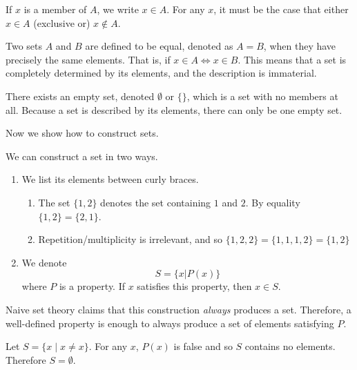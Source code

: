 \documentclass{article}
\begin{document}
    \begin{definition}[Membership]
      If $x$ is a member of $A$, we write $x \in A$. For any $x$, it must be the case that either $x \in A$ (exclusive or) $x \not\in A$. 
    \end{definition}
    
    \begin{definition}[Equality]
      Two sets $A$ and $B$ are defined to be equal, denoted as $A = B$, when they have precisely the same elements. That is, if $x \in A \iff x \in B$. This means that a set is completely determined by its elements, and the description is immaterial. 
    \end{definition}

    \begin{definition}
      There exists an empty set, denoted $\emptyset$ or $\{\}$, which is a set with no members at all. Because a set is described by its elements, there can only be one empty set. 
    \end{definition}

    Now we show how to construct sets. 

    \begin{definition}
      We can construct a set in two ways. 
      \begin{enumerate}
        \item We list its elements between curly braces. 
        \begin{enumerate}
          \item The set $\{1, 2\}$ denotes the set containing $1$ and $2$. By equality $\{1, 2\} = \{2, 1\}$. 
          \item Repetition/multiplicity is irrelevant, and so $\{1, 2, 2\} = \{1, 1, 1, 2\} = \{1, 2\}$ 
        \end{enumerate} 

        \item We denote 
        \begin{equation}
          S = \{ x | P(x) \}
        \end{equation} 
        where $P$ is a property. If $x$ satisfies this property, then $x \in S$. 
      \end{enumerate}
      Naive set theory claims that this construction \textit{always} produces a set. Therefore, a well-defined property is enough to always produce a set of elements satisfying $P$. 
    \end{definition} 

    \begin{example}
      Let $S = \{x \mid x \neq x \}$. For any $x$, $P(x)$ is false and so $S$ contains no elements. Therefore $S = \emptyset$. 
    \end{example}
\end{document}
